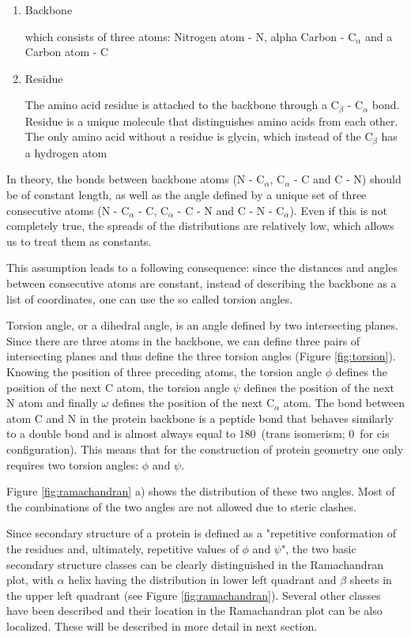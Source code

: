 \begin{enumerate}
    \item Backbone
    
        which consists of three atoms: Nitrogen atom - N, alpha Carbon - C$_\alpha$ and a Carbon atom - C
    \item Residue
        
        The amino acid residue is attached to the backbone through a C$_\beta$ - C$_\alpha$ bond. Residue is a unique molecule that distinguishes amino acids from each other. The only amino acid without a residue is glycin, which instead of the C$_\beta$ has a hydrogen atom  
\end{enumerate}

In theory, the bonds between backbone atoms (N - C$_\alpha$, C$_\alpha$ - C and C - N) should be of constant length, as well as the angle defined by a unique set of three consecutive atoms (N - C$_\alpha$ - C, C$_\alpha$ - C - N and C - N - C$_\alpha$). Even if this is not completely true, the spreads of the distributions are relatively low, which allows us to treat them as constants.

This assumption leads to a following consequence: since the distances and angles between consecutive atoms are constant, instead of describing the backbone as a list of coordinates, one can use the so called torsion angles.

Torsion angle, or a dihedral angle, is an angle defined by two intersecting planes. Since there are three atoms in the backbone, we can define three pairs of intersecting planes and thus define the three torsion angles (Figure \ref{fig:torsion}). Knowing the position of three preceding atoms, the torsion angle $\phi$ defines the position of the next C atom, the torsion angle $\psi$ defines the position of the next N atom and finally $\omega$ defines the position of the next C$_\alpha$ atom. The bond between atom C and N in the protein backbone is a peptide bond that behaves similarly to a double bond and is almost always equal to 180\degree~(trans isomerism; 0\degree~for cis configuration). This means that for the construction of protein geometry one only requires two torsion angles: $\phi$ and $\psi$.

Figure \ref{fig:ramachandran} a) shows the distribution of these two angles. Most of the combinations of the two angles are not allowed due to steric clashes. 

Since secondary structure of a protein is defined as a "repetitive conformation of the residues and, ultimately, repetitive values of $\phi$ and $\psi$", the two basic secondary structure classes can be clearly distinguished in the Ramachandran plot, with $\alpha$ helix having the distribution in lower left quadrant and $\beta$ sheets in the upper left quadrant (see Figure \ref{fig:ramachandran}). Several other classes have been described and their location in the Ramachandran plot can be also localized. These will be described in more detail in next section. 

